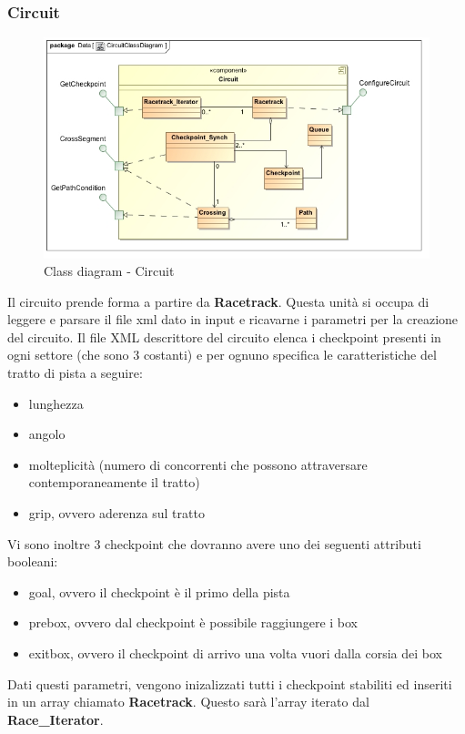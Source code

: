 \subsubsection{Circuit}
\begin{center}
\begin{figure}[h!]
	\includegraphics[scale=0.50]{img/ClassDiagrams/CircuitClassDiagram.jpg}
\caption{Class diagram - Circuit}
\end{figure}
\end{center}
Il circuito prende forma a partire da \textbf{Racetrack}. Questa unit\`{a} si occupa di leggere e parsare il file xml dato in input e ricavarne
i parametri per la creazione del circuito. Il file XML descrittore del circuito elenca i checkpoint presenti in ogni settore (che sono
3 costanti) e per ognuno specifica le caratteristiche del tratto di pista a seguire:
\begin{itemize}
  \item lunghezza
  \item angolo
  \item molteplicit\`{a} (numero di concorrenti che possono attraversare contemporaneamente il tratto)
  \item grip, ovvero aderenza sul tratto
\end{itemize}
Vi sono inoltre 3 checkpoint che dovranno avere uno dei seguenti attributi booleani:
\begin{itemize}
\item goal, ovvero il checkpoint \`{e} il primo della pista
\item prebox, ovvero dal checkpoint \`{e} possibile raggiungere i box
\item exitbox, ovvero il checkpoint di arrivo una volta vuori dalla corsia dei box
\end{itemize}
Dati questi parametri, vengono inizalizzati tutti i checkpoint stabiliti ed inseriti in un array chiamato \textbf{Racetrack}. Questo
sar\`{a} l'array iterato dal \textbf{Race\_Iterator}.\\

